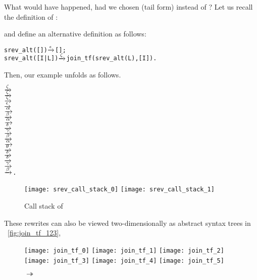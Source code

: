What would have happened, had we chosen  (tail
form) instead of ? Let us recall the definition of
:

and define an alternative definition  as follows:
\begin{alltt}
srev_alt(   []) \(\smashedrightarrow{\epsilon}\) [];
srev_alt([I|L]) \(\smashedrightarrow{\zeta}\) join_tf(srev_alt(L),[I]).
\end{alltt}
Then, our example unfolds as follows.\label{rev_321}
\begin{alltt}
    \(\smashedrightarrow{\zeta}\) 
    \(\smashedrightarrow{\zeta}\) 
    \(\smashedrightarrow{\zeta}\) 
    \(\smashedrightarrow{\epsilon}\) 
    \(\smashedrightarrow{\alpha}\) 
    \(\smashedrightarrow{\beta}\) 
    \(\smashedrightarrow{\alpha}\) 
    \(\smashedrightarrow{\delta}\) 
    \(\smashedrightarrow{\gamma}\) 
    \(\smashedrightarrow{\beta}\) 
    \(\smashedrightarrow{\alpha}\) 
    \(\smashedrightarrow{\theta}\) 
    \(\smashedrightarrow{\delta}\) 
    \(\smashedrightarrow{\delta}\) 
    \(\smashedrightarrow{\gamma}\) 
    \(\smashedrightarrow{\beta}\) \erlcode{[1,2,3]}\textrm{.}
\end{alltt}
\begin{figure}[h]
\centering
\texttt{[image: srev\_call\_stack\_0]}
\texttt{[image: srev\_call\_stack\_1]}
\caption{Call stack of \protect\figs~\protect{}\label{fig:rev_steps}}
\end{figure}
These rewrites can also be viewed two\hyp{}dimensionally as abstract
syntax trees in \fig~\vref{fig:join_tf_123}, 
\begin{figure}
\centering
\vspace{-4pt}
\texttt{[image: join\_tf\_0]}
\texttt{[image: join\_tf\_1]}
\texttt{[image: join\_tf\_2]}
\hspace{-6pt}
\texttt{[image: join\_tf\_3]}
\hspace{12pt}
\texttt{[image: join\_tf\_4]}
\texttt{[image: join\_tf\_5]}
\caption{
\(\!\!\!\twoheadrightarrow\!\!\!\) \erlcode{[1,2,3]}
\label{fig:join_tf_123}}
\end{figure}
